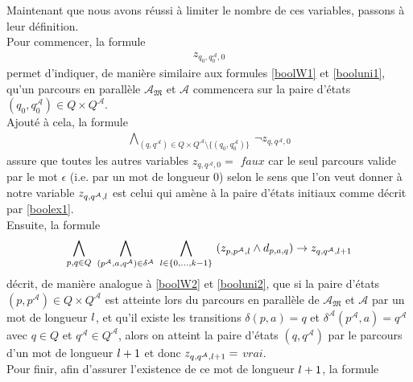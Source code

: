 \documentclass[12pt,a4paper,oneside,titlepage]{report}
\begin{document}
Maintenant que nous avons réussi à limiter le nombre de ces variables, passons à leur définition.\\
Pour commencer, la formule  
\begin{equation}
\label{boolex1}
\begin{aligned}
z_{q_0,q_0^\mathcal{A},0}
\end{aligned}
\end{equation}
permet d'indiquer, de manière similaire aux formules \ref{boolW1} et \ref{booluni1}, qu'un parcours en parallèle $\mathcal{A}_\mathfrak{M}$ et $\mathcal{A}$ commencera sur la paire d'états $(q_0,q_0^\mathcal{A})\in Q\times Q^\mathcal{A}$.\\
Ajouté à cela, la formule 
\begin{equation}
\label{boolex2}
\begin{aligned}
\bigwedge_{(q,q^\mathcal{A})\in Q\times Q^\mathcal{A}\setminus \{(q_0,q_0^\mathcal{A})\}}~ \neg z_{q,q^\mathcal{A},0}
\end{aligned}
\end{equation}
assure que toutes les autres variables $z_{q,q^\mathcal{A},0}=$ $faux$ car le seul parcours valide par le mot $\epsilon$ (i.e. par un mot de longueur $0$) selon le sens que l'on veut donner à notre variable $z_{q,q^\mathcal{A},\mathnormal{l}}$ est celui qui amène à la paire d'états initiaux comme décrit par \ref{boolex1}.\\
Ensuite, la formule
\begin{equation}
\label{boolex3}
\begin{aligned}
\bigwedge_{p,q\in Q}~ \bigwedge_{(p^\mathcal{A},a,q^\mathcal{A})\in\delta^\mathcal{A}}~ \bigwedge_{\mathnormal{l}\in\{0,... ,k-1\}}~ (z_{p,p^\mathcal{A}, \mathnormal{l}}\land d_{p,a,q})\rightarrow z_{q,q^\mathcal{A},\mathnormal{l}+1}
\end{aligned}
\end{equation}
décrit, de manière analogue à \ref{boolW2} et \ref{booluni2}, que si la paire d'états $(p,p^\mathcal{A})\in Q\times Q^\mathcal{A}$ est atteinte lors du parcours en parallèle de $\mathcal{A}_\mathfrak{M}$ et $\mathcal{A}$ par un mot de longueur $\mathnormal{l}$, et qu'il existe les transitions $\delta (p,a)=q$ et $\delta^\mathcal{A}(p^\mathcal{A},a)=q^\mathcal{A}$ avec $q\in Q$ et $q^\mathcal{A}\in Q^\mathcal{A}$, alors on atteint la paire d'états $(q,q^\mathcal{A})$ par le parcours d'un mot de longueur $\mathnormal{l}+1$ et donc $z_{q,q^\mathcal{A},\mathnormal{l}+1}=$ $vrai$.\\
Pour finir, afin d'assurer l'existence de ce mot de longueur $\mathnormal{l}+1$, la formule 
\end{document}
